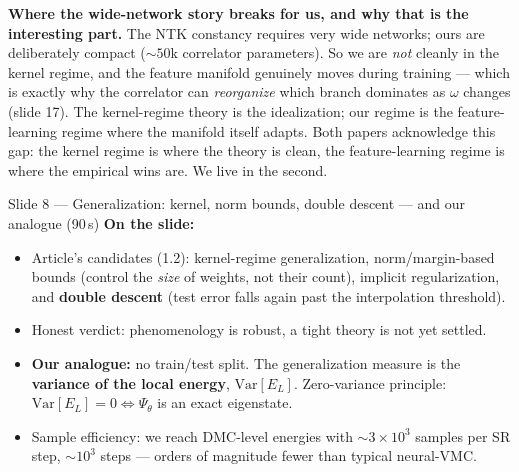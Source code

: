 \documentclass[11pt]{article}
\begin{document}
\begin{depth}
\textbf{Where the wide-network story breaks for us, and why that is the interesting part.} The NTK
constancy requires very wide networks; ours are deliberately compact ($\sim 50$k correlator
parameters). So we are \emph{not} cleanly in the kernel regime, and the feature manifold genuinely
moves during training --- which is exactly why the correlator can \emph{reorganize} which branch
dominates as $\omega$ changes (slide 17). The kernel-regime theory is the idealization; our regime is
the feature-learning regime where the manifold itself adapts. Both papers acknowledge this gap: the
kernel regime is where the theory is clean, the feature-learning regime is where the empirical wins
are. We live in the second.
\end{depth}

\begin{slide}{Slide 8 --- Generalization: kernel, norm bounds, double descent --- and our analogue (90\,s)}
\textbf{On the slide:}
\begin{itemize}[leftmargin=*]
\item Article's candidates (1.2): kernel-regime generalization, norm/margin-based bounds (control the
\emph{size} of weights, not their count), implicit regularization, and \textbf{double descent}
(test error falls again past the interpolation threshold).
\item Honest verdict: phenomenology is robust, a tight theory is not yet settled.
\item \textbf{Our analogue:} no train/test split. The generalization measure is the
\textbf{variance of the local energy}, $\mathrm{Var}[E_L]$. Zero-variance principle:
$\mathrm{Var}[E_L]=0\iff\Psi_\theta$ is an exact eigenstate.
\item Sample efficiency: we reach DMC-level energies with $\sim 3\times10^3$ samples per SR step,
$\sim 10^3$ steps --- orders of magnitude fewer than typical neural-VMC.
\end{itemize}
\end{slide}
\end{document}
